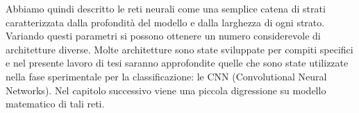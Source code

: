Abbiamo quindi descritto le reti neurali come una semplice catena di strati caratterizzata
 dalla profondità del modello e dalla larghezza di ogni strato. Variando questi parametri 
 si possono ottenere un numero considerevole di architetture diverse. Molte architetture
  sono state sviluppate per compiti specifici e nel presente lavoro di tesi saranno approfondite
   quelle che sono state utilizzate nella fase sperimentale per la classificazione:
    le CNN (Convolutional Neural Networks). 
Nel capitolo successivo viene una piccola digressione su modello matematico di tali reti.



